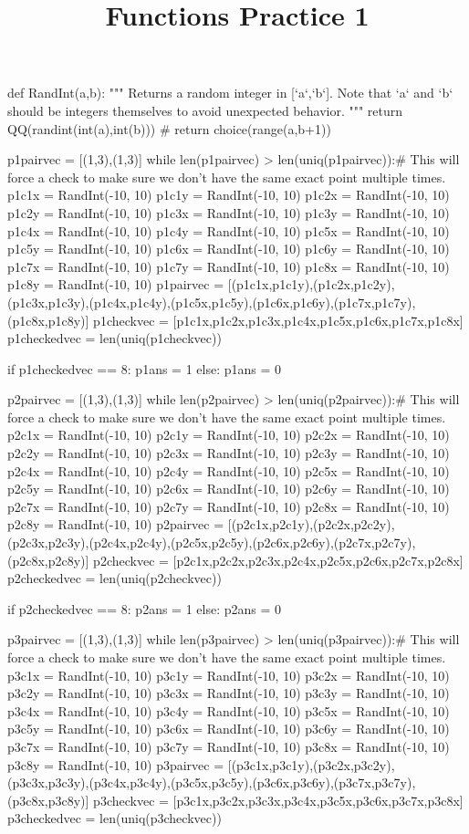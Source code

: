 \documentclass{ximeraXloud}
\title{Functions Practice 1}
\begin{document}
%
\begin{sagesilent}
def RandInt(a,b):
    """ Returns a random integer in [`a`,`b`]. Note that `a` and `b` should be integers themselves to avoid unexpected behavior.
    """
    return QQ(randint(int(a),int(b)))
    # return choice(range(a,b+1))


p1pairvec = [(1,3),(1,3)]
while len(p1pairvec) > len(uniq(p1pairvec)):# This will force a check to make sure we don't have the same exact point multiple times.
    p1c1x = RandInt(-10, 10)
    p1c1y = RandInt(-10, 10)
    p1c2x = RandInt(-10, 10)
    p1c2y = RandInt(-10, 10)
    p1c3x = RandInt(-10, 10)
    p1c3y = RandInt(-10, 10)
    p1c4x = RandInt(-10, 10)
    p1c4y = RandInt(-10, 10)
    p1c5x = RandInt(-10, 10)
    p1c5y = RandInt(-10, 10)
    p1c6x = RandInt(-10, 10)
    p1c6y = RandInt(-10, 10)
    p1c7x = RandInt(-10, 10)
    p1c7y = RandInt(-10, 10)
    p1c8x = RandInt(-10, 10)
    p1c8y = RandInt(-10, 10)
    p1pairvec = [(p1c1x,p1c1y),(p1c2x,p1c2y),(p1c3x,p1c3y),(p1c4x,p1c4y),(p1c5x,p1c5y),(p1c6x,p1c6y),(p1c7x,p1c7y),(p1c8x,p1c8y)]
p1checkvec = [p1c1x,p1c2x,p1c3x,p1c4x,p1c5x,p1c6x,p1c7x,p1c8x]
p1checkedvec = len(uniq(p1checkvec))

if p1checkedvec == 8:
    p1ans = 1
else:
    p1ans = 0

p2pairvec = [(1,3),(1,3)]
while len(p2pairvec) > len(uniq(p2pairvec)):# This will force a check to make sure we don't have the same exact point multiple times.
    p2c1x = RandInt(-10, 10)
    p2c1y = RandInt(-10, 10)
    p2c2x = RandInt(-10, 10)
    p2c2y = RandInt(-10, 10)
    p2c3x = RandInt(-10, 10)
    p2c3y = RandInt(-10, 10)
    p2c4x = RandInt(-10, 10)
    p2c4y = RandInt(-10, 10)
    p2c5x = RandInt(-10, 10)
    p2c5y = RandInt(-10, 10)
    p2c6x = RandInt(-10, 10)
    p2c6y = RandInt(-10, 10)
    p2c7x = RandInt(-10, 10)
    p2c7y = RandInt(-10, 10)
    p2c8x = RandInt(-10, 10)
    p2c8y = RandInt(-10, 10)
    p2pairvec = [(p2c1x,p2c1y),(p2c2x,p2c2y),(p2c3x,p2c3y),(p2c4x,p2c4y),(p2c5x,p2c5y),(p2c6x,p2c6y),(p2c7x,p2c7y),(p2c8x,p2c8y)]
p2checkvec = [p2c1x,p2c2x,p2c3x,p2c4x,p2c5x,p2c6x,p2c7x,p2c8x]
p2checkedvec = len(uniq(p2checkvec))

if p2checkedvec == 8:
    p2ans = 1
else:
    p2ans = 0

p3pairvec = [(1,3),(1,3)]
while len(p3pairvec) > len(uniq(p3pairvec)):# This will force a check to make sure we don't have the same exact point multiple times.
    p3c1x = RandInt(-10, 10)
    p3c1y = RandInt(-10, 10)
    p3c2x = RandInt(-10, 10)
    p3c2y = RandInt(-10, 10)
    p3c3x = RandInt(-10, 10)
    p3c3y = RandInt(-10, 10)
    p3c4x = RandInt(-10, 10)
    p3c4y = RandInt(-10, 10)
    p3c5x = RandInt(-10, 10)
    p3c5y = RandInt(-10, 10)
    p3c6x = RandInt(-10, 10)
    p3c6y = RandInt(-10, 10)
    p3c7x = RandInt(-10, 10)
    p3c7y = RandInt(-10, 10)
    p3c8x = RandInt(-10, 10)
    p3c8y = RandInt(-10, 10)
    p3pairvec = [(p3c1x,p3c1y),(p3c2x,p3c2y),(p3c3x,p3c3y),(p3c4x,p3c4y),(p3c5x,p3c5y),(p3c6x,p3c6y),(p3c7x,p3c7y),(p3c8x,p3c8y)]
p3checkvec = [p3c1x,p3c2x,p3c3x,p3c4x,p3c5x,p3c6x,p3c7x,p3c8x]
p3checkedvec = len(uniq(p3checkvec))


\end{sagesilent}
\end{document}
